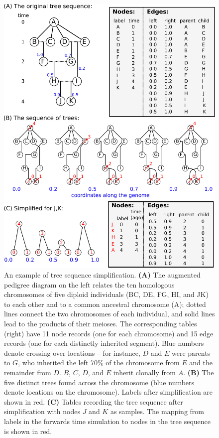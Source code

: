 \documentclass{article}
\begin{document}
\begin{figure}
    \begin{center}
        \includegraphics{method_diagram}
    \end{center}
    \caption{
        An example of tree sequence simplification.
        \textbf{(A)} The augmented pedigree diagram on the left
        relates the ten homologous chromosomes of five diploid individuals (BC, DE, FG, HI, and JK)
        to each other and to a common ancestral chromosome (A);
        dotted lines connect the two chromosomes of each individual,
        and solid lines lead to the products of their meioses.
        The corresponding tables (right) have 11 node records (one for each chromosome)
        and 15 edge records (one for each distinctly inherited segment).
        Blue numbers denote crossing over locations --
        for instance, $D$ and $E$ were parents to $G$,
        who inherited the left 70\% of the chromosome from $E$ and the remainder from $D$.
        $B$, $C$, $D$, and $E$ inherit clonally from $A$.
        \textbf{(B)} The five distinct trees
        found across the chromosome (blue numbers denote locations on the chromosome).
        Labels after simplification are shown in red.
        \textbf{(C)} Tables recording the tree sequence after simplification
        with nodes $J$ and $K$ as samples.
        The mapping from labels in the forwards time simulation to nodes in the tree sequence
        is shown in red.
        \label{fig:method_diagram}
    }
\end{figure}
\end{document}
